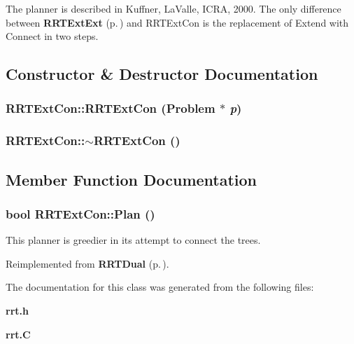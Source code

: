 The planner is described in Kuffner, La\-Valle, ICRA, 2000. The only difference between {\bf RRTExt\-Ext} {\rm (p.\,\pageref{classRRTExtExt})} and RRTExt\-Con is the replacement of Extend with Connect in two steps. 



\subsection{Constructor \& Destructor Documentation}
\subsubsection{\setlength{\rightskip}{0pt plus 5cm}RRTExt\-Con::RRTExt\-Con ({\bf Problem} $\ast$ {\em p})}\label{classRRTExtCon_a0}


\subsubsection{\setlength{\rightskip}{0pt plus 5cm}RRTExt\-Con::$\sim$RRTExt\-Con ()\hspace{0.3cm}{\tt  [inline, virtual]}}\label{classRRTExtCon_a1}




\subsection{Member Function Documentation}
\subsubsection{\setlength{\rightskip}{0pt plus 5cm}bool RRTExt\-Con::Plan ()\hspace{0.3cm}{\tt  [virtual]}}\label{classRRTExtCon_a2}


This planner is greedier in its attempt to connect the trees.



Reimplemented from {\bf RRTDual} {\rm (p.\,\pageref{classRRTDual_a2})}.

The documentation for this class was generated from the following files:\begin{CompactItemize}
\item 
{\bf rrt.h}\item 
{\bf rrt.C}\end{CompactItemize}
